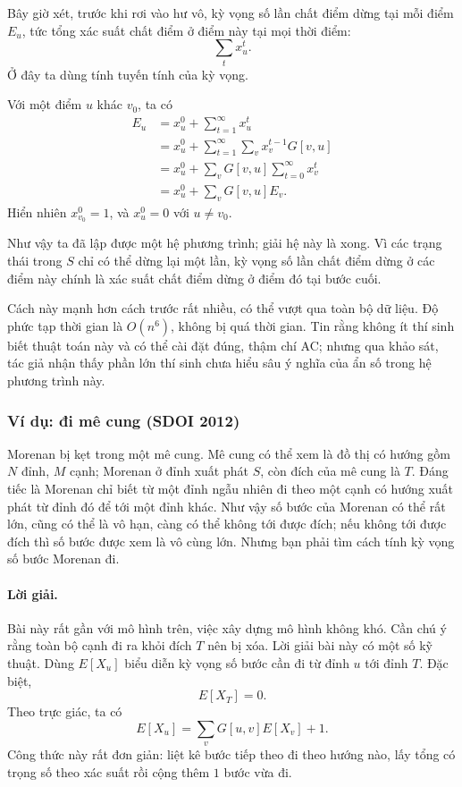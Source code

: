 \documentclass[11pt]{article}
\begin{document}
Bây giờ xét, trước khi rơi vào hư vô, kỳ vọng số lần chất điểm dừng tại mỗi
điểm \(E_u\), tức tổng xác suất chất điểm ở điểm này tại mọi thời điểm:
\[
  \sum_t x_u^t.
\]
Ở đây ta dùng tính tuyến tính của kỳ vọng.

Với một điểm \(u\) khác \(v_0\), ta có
\[
\begin{aligned}
E_u
  &= x_u^0+\sum_{t=1}^{\infty}x_u^t\\
  &= x_u^0+\sum_{t=1}^{\infty}\sum_v x_v^{t-1}G[v,u]\\
  &= x_u^0+\sum_v G[v,u]\sum_{t=0}^{\infty}x_v^t\\
  &= x_u^0+\sum_v G[v,u]E_v.
\end{aligned}
\]
Hiển nhiên \(x_{v_0}^0=1\), và \(x_u^0=0\) với \(u\ne v_0\).

Như vậy ta đã lập được một hệ phương trình; giải hệ này là xong. Vì các
trạng thái trong \(S\) chỉ có thể dừng lại một lần, kỳ vọng số lần chất điểm
dừng ở các điểm này chính là xác suất chất điểm dừng ở điểm đó tại bước cuối.

Cách này mạnh hơn cách trước rất nhiều, có thể vượt qua toàn bộ dữ liệu.
Độ phức tạp thời gian là \(O(n^6)\), không bị quá thời gian. Tin rằng không
ít thí sinh biết thuật toán này và có thể cài đặt đúng, thậm chí AC; nhưng
qua khảo sát, tác giả nhận thấy phần lớn thí sinh chưa hiểu sâu ý nghĩa của
ẩn số trong hệ phương trình này.

\subsubsection{Ví dụ: đi mê cung (SDOI 2012)}

Morenan bị kẹt trong một mê cung. Mê cung có thể xem là đồ thị có hướng gồm
\(N\) đỉnh, \(M\) cạnh; Morenan ở đỉnh xuất phát \(S\), còn đích của mê cung
là \(T\). Đáng tiếc là Morenan chỉ biết từ một đỉnh ngẫu nhiên đi theo một
cạnh có hướng xuất phát từ đỉnh đó để tới một đỉnh khác. Như vậy số bước của
Morenan có thể rất lớn, cũng có thể là vô hạn, càng có thể không tới được
đích; nếu không tới được đích thì số bước được xem là vô cùng lớn. Nhưng bạn
phải tìm cách tính kỳ vọng số bước Morenan đi.

\paragraph{Lời giải.}
Bài này rất gần với mô hình trên, việc xây dựng mô hình không khó. Cần chú ý
rằng toàn bộ cạnh đi ra khỏi đích \(T\) nên bị xóa. Lời giải bài này có một
số kỹ thuật. Dùng \(E[X_u]\) biểu diễn kỳ vọng số bước cần đi từ đỉnh \(u\)
tới đỉnh \(T\). Đặc biệt,
\[
  E[X_T]=0.
\]
Theo trực giác, ta có
\[
  E[X_u]=\sum_v G[u,v]E[X_v]+1.
\]
Công thức này rất đơn giản: liệt kê bước tiếp theo đi theo hướng nào, lấy
tổng có trọng số theo xác suất rồi cộng thêm \(1\) bước vừa đi.
\end{document}
